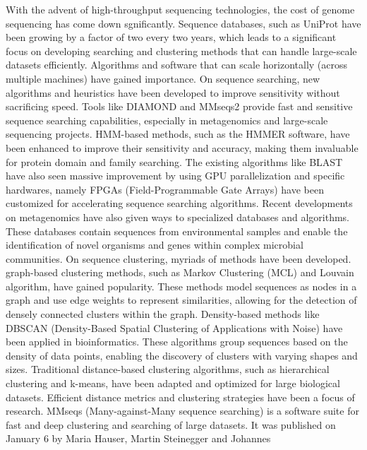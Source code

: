 \documentclass[twoside,a4paper,bsc]{master}
\begin{document}
With the advent of high-throughput sequencing technologies, the cost of
genome sequencing has come down sgnificantly. Sequence databases, such as
UniProt have been growing by a factor of two every two years, which leads
to a significant focus on developing searching and clustering methods that
can handle large-scale datasets efficiently. Algorithms and software that
can scale horizontally (across multiple machines) have gained importance.
On sequence searching, new algorithms and heuristics have been developed to
improve sensitivity without sacrificing speed. Tools like DIAMOND and
MMseqs2 provide fast and sensitive sequence searching capabilities,
especially in metagenomics and large-scale sequencing projects. HMM-based
methods, such as the HMMER software, have been enhanced to improve their
sensitivity and accuracy, making them invaluable for protein domain and
family searching. The existing algorithms like BLAST have also seen massive
improvement by using GPU parallelization and specific hardwares, namely
FPGAs (Field-Programmable Gate Arrays) have been customized for
accelerating sequence searching algorithms.
Recent developments on metagenomics have also given ways to specialized
databases and algorithms. These databases contain sequences from
environmental samples and enable the identification of novel organisms and
genes within complex microbial communities.
On sequence clustering, myriads of methods have been developed. graph-based
clustering methods, such as Markov Clustering (MCL) and Louvain algorithm,
have gained popularity. These methods model sequences as nodes in a graph
and use edge weights to represent similarities, allowing for the detection
of densely connected clusters within the graph. Density-based methods like
DBSCAN (Density-Based Spatial Clustering of Applications with Noise) have
been applied in bioinformatics. These algorithms group sequences based on
the density of data points, enabling the discovery of clusters with varying
shapes and sizes. Traditional distance-based clustering algorithms, such as
hierarchical clustering and k-means, have been adapted and optimized for
large biological datasets. Efficient distance metrics and clustering
strategies have been a focus of research.
MMseqs (Many-against-Many sequence searching) is a software suite for fast
and deep clustering and searching of large datasets. It was published on
January 6  by Maria Hauser, Martin Steinegger and Johannes
\end{document}
